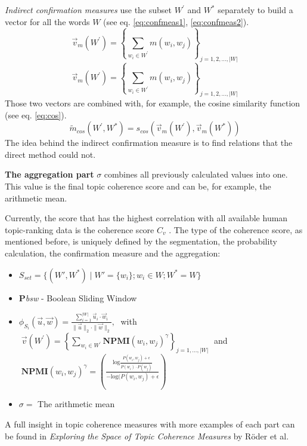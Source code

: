 \textit{Indirect confirmation measures} use the subset $W^{'}$ and $W^{*}$ separately to build a vector for all the words $W$ (see eq. \ref{eq:confmeas1}, \ref{eq:confmeas2}).
\begin{equation}
    \vec{v}_m(W^{'})=\left\{\sum_{w_i\in W^{'}}{m(w_i,w_j)}\right\}_{j=1,2,...,|W|}
    \label{eq:confmeas1}
\end{equation}
\begin{equation}
    \vec{v}_m(W^{'})=\left\{\sum_{w_i\in W^{'}}{m(w_i,w_j)}\right\}_{j=1,2,...,|W|}
    \label{eq:confmeas2}
\end{equation}
Those two vectors are combined with, for example, the cosine similarity function (see eq. \ref{eq:cos}).
\begin{equation}
    \tilde{m}_{cos}(W^{'},W^{*})=s_{cos}(\vec{v}_m(W^{'}),\vec{v}_m(W^{*}))
    \label{eq:cos}
\end{equation}
The idea behind the indirect confirmation measure is to find relations that the direct method could not.

\textbf{The aggregation part} $\sigma$ combines all previously calculated values into one. This value is the final topic coherence score and can be, for example, the arithmetic mean.

Currently, the score that has the highest correlation with all available human topic-ranking data is the coherence score $C_v$ \cite{syed2017full}. The type of the coherence score, as mentioned before, is uniquely defined by the segmentation, the probability calculation, the confirmation measure and the aggregation:
\begin{itemize}
    \item $S_{set} = \{(W', W^{*})\mid W' = \{w_i\}; w_{i} \in W; W^{*} = W\}$
    \item \textbf{P}\textit{bsw} - Boolean Sliding Window
    \item $\phi_{S_i}(\vec{u},\vec{w})=\frac{\sum_{i=1}^{|W|}{\vec{u}_i}\cdot\vec{w}_i}{\|\vec{u}\|_2\cdot\|\vec{w}\|_2},\;$ with $\;
           \vec{v}(W^{'})=\left\{\sum_{w_i\in W^{'}}{\textbf{NPMI}(w_i,w_j)^{\gamma}}\right\}_{j=1,...,|W|}\;$ and 
            $\;\textbf{NPMI}(w_i,w_j)^{\gamma}=\left(\frac{\text{log}\frac{P(w_i,w_j)+\epsilon}{P(w_i)\cdot P(w_j)}}{-\text{log}(P(w_i,w_j)+\epsilon}\right)$
    \item $\sigma=$ The arithmetic mean
\end{itemize}

A full insight in topic coherence measures with more examples of each part can be found in \textit{Exploring the Space of Topic Coherence Measures} by Röder et al. \cite{roder2015exploring}

